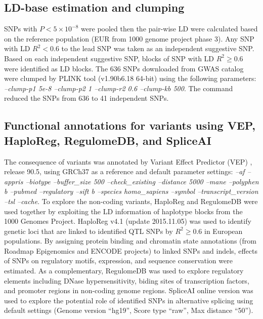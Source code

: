 \documentclass{book}
\begin{document}
\begin{refsection}
\subsection*{LD-base estimation and clumping}
SNPs with $P < 5 \times 10^{-8}$ were pooled then the pair-wise LD were calculated based on the reference population (EUR from 1000 genome project phase 3).
Any SNP with LD $R^2 < 0.6$ to the lead SNP was taken as an independent suggestive SNP.
Based on each independent suggestive SNP, blocks of SNP with LD $R^2 \ge 0.6$ were identified as LD blocks.
The 636 SNPs downloaded from GWAS catalog were clumped by PLINK \cite{Purcell2007PLINK} tool (v1.90b6.18 64-bit) using the following parameters: \textit{--clump-p1 5e-8 --clump-p2 1 --clump-r2 0.6 --clump-kb 500}.
The command reduced the SNPs from 636 to 41 independent SNPs.

\subsection*{Functional annotations for variants using VEP, HaploReg, RegulomeDB, and SpliceAI}
The consequence of variants was annotated by Variant Effect Predictor (VEP) \cite{McLaren2016The}, release 90.5, using GRCh37 as a reference and default parameter settings: \textit{--af --appris --biotype --buffer\_size 500 --check\_existing --distance 5000 --mane --polyphen b --pubmed --regulatory --sift b --species homo\_sapiens --symbol --transcript\_version --tsl --cache}.
To explore the non-coding variants, HaploReg \cite{Ward2011HaploReg} and RegulomeDB \cite{Boyle2012Annotation} were used together by exploiting the LD information of haplotype blocks from the 1000 Genomes Project.
HaploReg v4.1 (update 2015.11.05) was used to identify genetic loci that are linked to identified QTL SNPs by $R^2 \ge 0.6$ in European populations.
By assigning protein binding and chromatin state annotations (from Roadmap Epigenomics and ENCODE projects) to linked SNPs and indels, effects of SNPs on regulatory motifs, expression, and sequence conservation were estimated.
As a complementary, RegulomeDB was used to explore regulatory elements including DNase hypersensitivity, biding sites of transcription factors, and promoter regions in non-coding genome regions.
SpliceAI \cite{Jaganathan2019Predicting} online version was used to explore the potential role of identified SNPs in alternative splicing using default settings (Genome version “hg19”, Score type “raw”, Max distance “50”).


\end{refsection}
\end{document}

